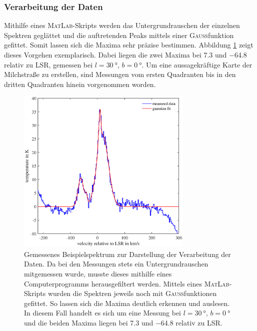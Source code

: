 \subsubsection{Verarbeitung der Daten}
Mithilfe eines \textsc{MatLab}-Skripts werden das Untergrundrauschen der einzelnen Spektren geglättet und die auftretenden Peaks mittels einer \textsc{Gauß}funktion gefittet. 
Somit lassen sich die Maxima sehr präzise bestimmen. 
Abbildung \ref{fig:TestBaseline} zeigt dieses Vorgehen exemplarisch. 
Dabei liegen die zwei Maxima bei \SI{7.3}{} und \SI{-64.8}{} relativ zu LSR, gemessen bei $l = \SI{30}{\degree}, \, b = \SI{0}{\degree}$. 
Um eine aussagekräftige Karte der Milchstraße zu erstellen, sind Messungen vom ersten Quadranten bis in den dritten Quadranten hinein vorgenommen worden.
\begin{figure}[H]
    \centering
    \includegraphics[width= 0.75\textwidth]{plots/TestBaseline.eps}
    \caption[Gemessenes Beispielspektrum zur Darstellung der Verarbeitung der Daten]{Gemessenes Beispielspektrum zur Darstellung der Verarbeitung der Daten. Da bei den Messungen stets ein Untergrundrauschen mitgemessen wurde, musste dieses mithilfe eines Computerprogramms herausgefiltert werden. Mittels eines \textsc{MatLab}-Skripts wurden die Spektren jeweils noch mit \textsc{Gauß}funktionen gefittet. So lassen sich die Maxima deutlich erkennen und auslesen. In diesem Fall handelt es sich um eine Messung bei $l = \SI{30}{\degree}, \, b = \SI{0}{\degree}$ und die beiden Maxima liegen bei \SI{7.3}{} und \SI{-64.8}{} relativ zu LSR.}
    \label{fig:TestBaseline}
\end{figure}
